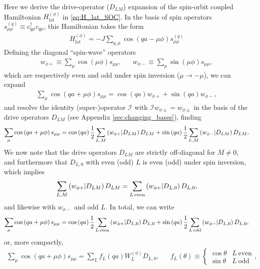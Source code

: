 \documentclass[nofootinbib,notitlepage,11pt]{revtex4-2}
\renewcommand{\t}{\text} %
\newcommand{\f}[2]{\dfrac{#1}{#2}} %
\newcommand{\p}[1]{\left(#1\right)} %
\newcommand{\1}{\mathds{1}}
\newcommand{\I}{\mathcal{I}}
\def\obk#1{\mathinner{({#1})}}
\begin{document}
Here we derive the drive-operator ($D_{LM}$) expansion of the
spin-orbit coupled Hamiltonian $H_{\t{lat}}^{(\phi)}$ in
\eqref{eq:H_lat_SOC}.  In the basis of spin operators
$s_{\mu\mu}^{(q)} \equiv c_{q\mu}^\dag c_{q\mu}$, this Hamiltonian
takes the form
\begin{align}
  H_{\t{lat}}^{(\phi)}
  = -J \sum_{q,\mu} \cos\p{qa-\mu\phi} s_{\mu\mu}^{(q)}
  \label{eq:H_lat_spin}
\end{align}
Defining the diagonal ``spin-wave'' operators
\begin{align}
  w_{\phi+} \equiv \sum_\mu \cos\p{\mu\phi} s_{\mu\mu},
  &&
  w_{\phi-} \equiv \sum_\mu \sin\p{\mu\phi} s_{\mu\mu},
\end{align}
which are respectively even and odd under spin inversion
($\mu\to-\mu$), we can expand
\begin{align}
  \sum_\mu \cos\p{qa+\mu\phi} s_{\mu\mu}
  = \cos\p{qa} w_{\phi+} + \sin\p{qa} w_{\phi-},
\end{align}
and resolve the identity (super-)operator $\I$ with
$\I w_{\phi\pm} = w_{\phi\pm}$ in the basis of the drive operators
$D_{LM}$ (see Appendix \ref{sec:changing_bases}), finding
\begin{align}
  \sum_\mu \cos\p{qa+\mu\phi} s_{\mu\mu}
  = \cos\p{qa} \f12 \sum_{L,M} \obk{w_{\phi+}|D_{LM}} D_{LM}
  + \sin\p{qa} \f12 \sum_{L,M} \obk{w_{\phi-}|D_{LM}} D_{LM}.
\end{align}
We now note that the drive operators $D_{LM}$ are strictly
off-diagonal for $M\ne0$, and furthermore that $D_{L,0}$ with even
(odd) $L$ is even (odd) under spin inversion, which implies
\begin{align}
  \sum_{L,M} \obk{w_{\phi+}|D_{LM}} D_{LM}
  = \sum_{L\,\t{even}} \obk{w_{\phi+}|D_{L,0}} D_{L,0},
\end{align}
and likewise with $w_{\phi-}$ and odd $L$.  In total, we can
write
\begin{align}
  \sum_\mu \cos\p{qa+\mu\phi} s_{\mu\mu}
  = \cos\p{qa} \f12 \sum_{L\,\t{even}}
  \obk{w_{\phi+}|D_{L,0}} D_{L,0}
  + \sin\p{qa} \f12 \sum_{L\,\t{odd}}
  \obk{w_{\phi-}|D_{L,0}} D_{L,0},
\end{align}
or, more compactly,
\begin{align}
  \sum_\mu \cos\p{qa+\mu\phi} s_{\mu\mu}
  = \sum_L f_L\p{qa} W_L^{(\phi)} D_{L,0},
  &&
  f_L\p{\theta} \equiv
  \begin{cases}
    \cos\theta & L~\t{even} \\
    \sin\theta & L~\t{odd}
  \end{cases},
  \label{eq:compact_SOC_drive}
\end{align}
\end{document}
